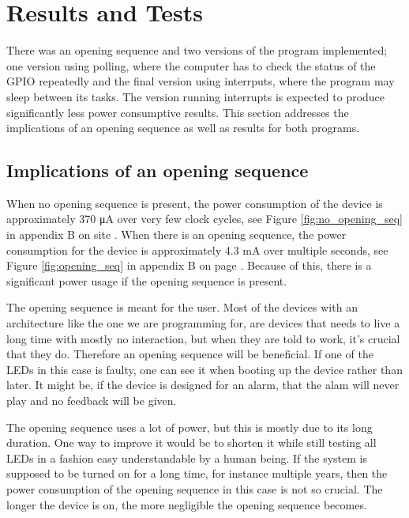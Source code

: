 \section{Results and Tests}

There was an opening sequence and two versions of the program implemented; one version using polling, where the computer has to check the status of the GPIO repeatedly and the final version using interrputs, where the program may sleep between its tasks. The version running interrupts is expected to produce significantly less power consumptive results. This section addresses the implications of an opening sequence as well as results for both programs.

\subsection{Implications of an opening sequence}

When no opening sequence is present, the power consumption of the device is approximately 370 \si{\micro\ampere} over very few clock cycles, see Figure \ref{fig:no_opening_seq} in appendix B on site \pageref{fig:no_opening_seq}. When there is an opening sequence, the power consumption for the device is approximately 4.3 \si{\milli\ampere} over multiple seconds, see Figure \ref{fig:opening_seq} in appendix B on page \pageref{fig:opening_seq}. Because of this, there is a significant power usage if the opening sequence is present.

The opening sequence is meant for the user. Most of the devices with an architecture like the one we are programming for, are devices that needs to live a long time with mostly no interaction, but when they are told to work, it's crucial that they do. Therefore an opening sequence will be beneficial. If one of the LEDs in this case is faulty, one can see it when booting up the device rather than later. It might be, if the device is designed for an alarm, that the alam will never play and no feedback will be given.

The opening sequence uses a lot of power, but this is mostly due to its long duration. One way to improve it would be to shorten it while still testing all LEDs in a fashion easy understandable by a human being. If the system is supposed to be turned on for a long time, for instance multiple years, then the power consumption of the opening sequence in this case is not so crucial. The longer the device is on, the more negligible the opening sequence becomes.

